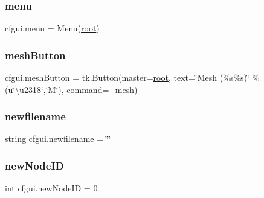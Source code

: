 \mbox{\label{namespacecfgui_a178f690140e4928e80ed598ebbbf6ec1}} 
\subsubsection{\texorpdfstring{menu}{menu}}
{\footnotesize\ttfamily cfgui.\+menu = Menu(\mbox{\hyperlink{namespacecfgui_ad0261b0d3cca8159d011afa3c17bd9f1}{root}})}

\mbox{\label{namespacecfgui_a4cb6233c9db194dad78f3a686d22475c}} 
\subsubsection{\texorpdfstring{mesh\+Button}{meshButton}}
{\footnotesize\ttfamily cfgui.\+mesh\+Button = tk.\+Button(master=\mbox{\hyperlink{namespacecfgui_ad0261b0d3cca8159d011afa3c17bd9f1}{root}}, text=\char`\"{}Mesh (\%s\%s)\char`\"{} \% (u\char`\"{}\textbackslash{}u2318\char`\"{},\char`\"{}M\char`\"{}), command=\+\_\+mesh)}

\mbox{\label{namespacecfgui_adacec56309d4b55d655ac53531223503}} 
\subsubsection{\texorpdfstring{newfilename}{newfilename}}
{\footnotesize\ttfamily string cfgui.\+newfilename = \char`\"{}\char`\"{}}

\mbox{\label{namespacecfgui_a69cb956a983205fbd404d059670db416}} 
\subsubsection{\texorpdfstring{new\+Node\+ID}{newNodeID}}
{\footnotesize\ttfamily int cfgui.\+new\+Node\+ID = 0}

\mbox{\label{namespacecfgui_ad0261b0d3cca8159d011afa3c17bd9f1}} 
